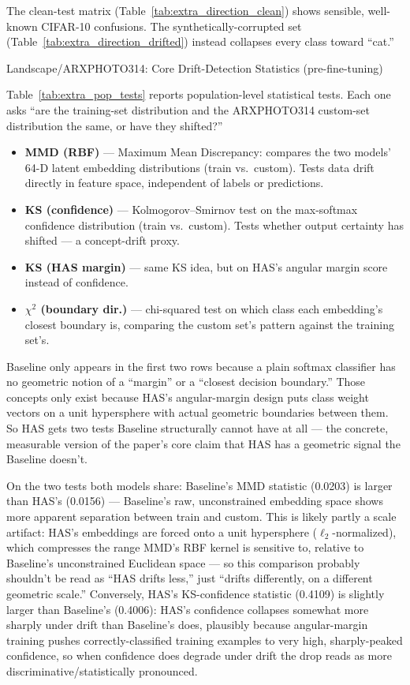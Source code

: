 The clean-test matrix (Table~\ref{tab:extra_direction_clean}) shows sensible, well-known CIFAR-10
confusions. The synthetically-corrupted set (Table~\ref{tab:extra_direction_drifted}) instead
collapses every class toward ``cat.''


Landscape/ARXPHOTO314: Core Drift-Detection Statistics (pre-fine-tuning)
\label{sec:extra_landscape_core}


Table~\ref{tab:extra_pop_tests} reports population-level statistical tests. Each one asks
``are the training-set distribution and the ARXPHOTO314 custom-set distribution the same, or
have they shifted?''

\begin{itemize}
  \item \textbf{MMD (RBF)} — Maximum Mean Discrepancy: compares the two models' 64-D latent
  embedding distributions (train vs.\ custom). Tests data drift directly in feature space,
  independent of labels or predictions.
  \item \textbf{KS (confidence)} — Kolmogorov--Smirnov test on the max-softmax confidence
  distribution (train vs.\ custom). Tests whether output certainty has shifted — a
  concept-drift proxy.
  \item \textbf{KS (HAS margin)} — same KS idea, but on HAS's angular margin score instead of
  confidence.
  \item \textbf{$\chi^2$ (boundary dir.)} — chi-squared test on which class each embedding's
  closest boundary is, comparing the custom set's pattern against the training set's.
\end{itemize}

Baseline only appears in the first two rows because a plain softmax classifier has no geometric
notion of a ``margin'' or a ``closest decision boundary.'' Those concepts only exist because HAS's
angular-margin design puts class weight vectors on a unit hypersphere with actual geometric
boundaries between them. So HAS gets two tests Baseline structurally cannot have at all — the
concrete, measurable version of the paper's core claim that HAS has a geometric signal the
Baseline doesn't.

On the two tests both models share: Baseline's MMD statistic (0.0203) is larger than HAS's
(0.0156) — Baseline's raw, unconstrained embedding space shows more apparent separation between
train and custom. This is likely partly a scale artifact: HAS's embeddings are forced onto a unit
hypersphere ($\ell_2$-normalized), which compresses the range MMD's RBF kernel is sensitive to,
relative to Baseline's unconstrained Euclidean space — so this comparison probably shouldn't be
read as ``HAS drifts less,'' just ``drifts differently, on a different geometric scale.''
Conversely, HAS's KS-confidence statistic (0.4109) is slightly larger than Baseline's (0.4006):
HAS's confidence collapses somewhat more sharply under drift than Baseline's does, plausibly
because angular-margin training pushes correctly-classified training examples to very high,
sharply-peaked confidence, so when confidence does degrade under drift the drop reads as more
discriminative/statistically pronounced.

